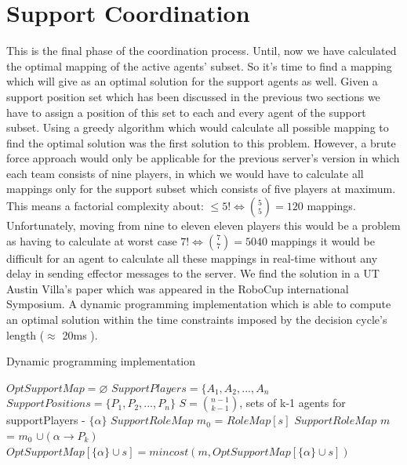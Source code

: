 \section{Support Coordination}
This is the final phase of the coordination process. Until, now we have calculated the optimal mapping of the active agents' subset. So it's time to find a mapping which will give as an optimal solution for the support agents as well. Given a support position set which has been discussed in the previous two sections we have to assign a position of this set to each and every agent of the support subset. Using a greedy algorithm which would calculate all possible mapping to find the optimal solution was the first solution to this problem. However, a brute force approach would only be applicable for the previous server's version in which each team consists of nine players, in which we would have to calculate all mappings only for the support subset which consists of five players at maximum. This means a factorial complexity about: $\leqslant 5! \Leftrightarrow  {{5}\choose{5}} = 120$ mappings. Unfortunately, moving from nine to eleven eleven players this would be a problem as having to calculate at worst case $ 7! \Leftrightarrow  {{7}\choose{7}} = 5040$ mappings it would be difficult for an agent to calculate all these mappings in real-time without any delay in sending effector messages to the server. We find the solution in a UT Austin Villa's paper which was appeared in the RoboCup international Symposium. A dynamic programming implementation which is able to compute an optimal solution within the time constraints imposed by the decision cycle's length ($\approx$ 20ms ).
\begin{algorithm}[htb!]
\caption{Dynamic programming implementation}
\label{alg3}
\begin{algorithmic}[1]
\STATE $OptSupportMap = \varnothing $
\STATE $SupportPlayers = \lbrace A_{1},A_{2},...,A_{n} $
\STATE $SupportPositions = \lbrace P_{1},P_{2},...,P_{n} \rbrace $
\STATE $ S = {{n-1}\choose{k-1}} $, sets of k-1 agents for supportPlayers - $\lbrace \alpha \rbrace$
\STATE $SupportRoleMap$ $m_{0}$ = $RoleMap[s]$
\STATE $SupportRoleMap$ $m$ = $m_{0}$ $ \cup (\alpha \rightarrow P_{k})$
\STATE $OptSupportMap[\lbrace \alpha \rbrace \cup s] = mincost(m,OptSupportMap[\lbrace \alpha \rbrace \cup s])$
\ENDFOR
\ENDFOR
\ENDFOR
\end{algorithmic}
\end{algorithm}

